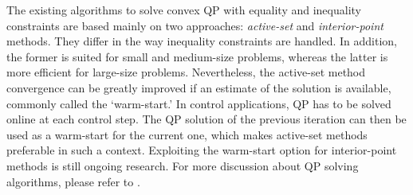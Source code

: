 The existing algorithms to solve convex QP with equality and inequality constraints are based mainly on two approaches: \emph{active-set} and \emph{interior-point} methods. They differ in the way inequality constraints are handled. In addition, the former is suited for small and medium-size problems, whereas the latter is more efficient for large-size problems. Nevertheless, the active-set method convergence can be greatly improved if an estimate of the solution is available, commonly called the ‘warm-start.’ In control applications, QP has to be solved online at each control step. The QP solution of the previous iteration can then be used as a warm-start for the current one, which makes active-set methods preferable in such a context. Exploiting the warm-start option for interior-point methods is still ongoing research. For more discussion about QP solving algorithms, please refer to \cite[Chapter 16]{nocedal2006springerBookOPtimization}.  
  
